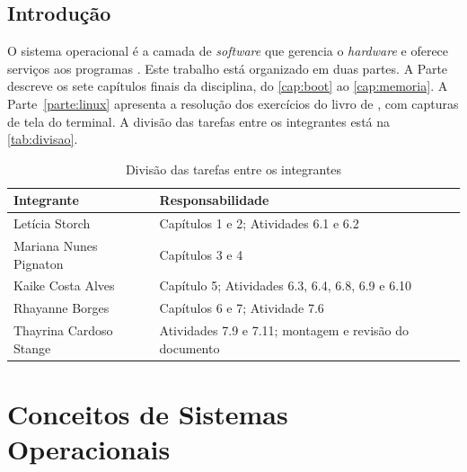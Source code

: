 \documentclass[12pt, a4paper, oneside, openany, chapter=TITLE, subsection=TITLE, section=TITLE, subsubsection=TITLE, subsubsubsection=TITLE, english, german, brazil]{abntex2}
\begin{document}
\tableofcontents*
\clearpage


\textual %

\chapter*[Introdução]{Introdução}

O sistema operacional é a camada de \textit{software} que gerencia o \textit{hardware} e oferece
serviços aos programas \cite{tanenbaum2016}. Este trabalho está organizado em duas partes.
A Parte~\ref{parte:conceitos} descreve os sete capítulos finais da disciplina, do
\autoref{cap:boot} ao \autoref{cap:memoria}. A Parte~\ref{parte:linux} apresenta a resolução
dos exercícios do livro de , com capturas de tela do terminal.
A divisão das tarefas entre os integrantes está na \autoref{tab:divisao}.

\begin{table}[H]
    \centering
    \caption{Divisão das tarefas entre os integrantes}
    \label{tab:divisao}
    \begin{tabularx}{\linewidth}{lX}
        \toprule
        \textbf{Integrante} & \textbf{Responsabilidade} \\
        \midrule
        Letícia Storch   & Capítulos 1 e 2; Atividades 6.1 e 6.2 \\
        Mariana Nunes Pignaton & Capítulos 3 e 4 \\
        Kaike Costa Alves & Capítulo 5; Atividades 6.3, 6.4, 6.8, 6.9 e 6.10 \\
        Rhayanne Borges  & Capítulos 6 e 7; Atividade 7.6 \\
        Thayrina Cardoso Stange & Atividades 7.9 e 7.11; montagem e revisão do documento \\
        \bottomrule
    \end{tabularx}
\end{table}

\part{Conceitos de Sistemas Operacionais}\label{parte:conceitos}







\end{document}
